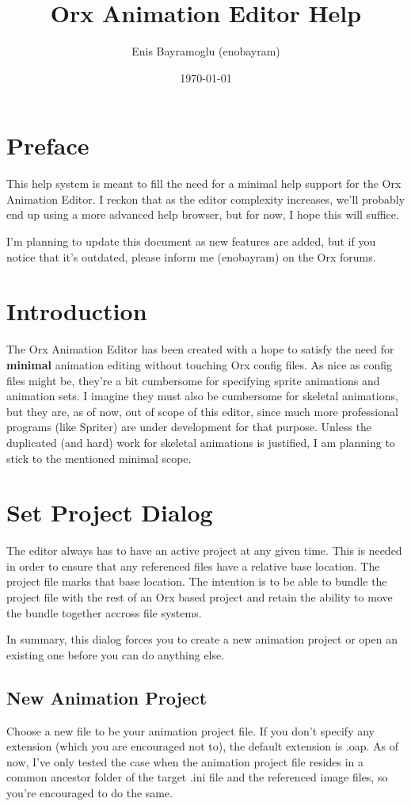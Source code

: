 \documentclass{article}
\title{Orx Animation Editor Help}
\author{Enis Bayramoglu (enobayram)}
\date{\today}
\begin{document}
\maketitle
\tableofcontents

\section{Preface}
This help system is meant to fill the need for a minimal help support for the Orx Animation Editor. I reckon that as the editor complexity increases,
we'll probably end up using a more advanced help browser, but for now, I hope this will suffice.

I'm planning to update this document as new features are added, but if you notice that it's outdated, please inform me (enobayram) on the Orx forums.

\section{Introduction}
The Orx Animation Editor has been created with a hope to satisfy the need for \textbf{minimal} animation editing without touching Orx config files. As nice as
config files might be, they're a bit cumbersome for specifying sprite animations and animation sets. I imagine they must also be cumbersome for skeletal
animations, but they are, as of now, out of scope of this editor, since much more professional programs (like Spriter) are under development for that purpose. Unless the duplicated (and hard) work for skeletal animations is justified, I am planning to stick to the mentioned minimal scope.

\section{Set Project Dialog}
The editor always has to have an active project at any given time. This is needed in order to ensure that any referenced files have a relative base location. The project
file marks that base location. The intention is to be able to bundle the project file with the rest of an Orx based project and retain the ability to move the bundle together accross file systems.

In summary, this dialog forces you to create a new animation project or open an existing one before you can do anything else.

\subsection{New Animation Project}
Choose a new file to be your animation project file. If you don't specify any extension (which you are encouraged not to), the default extension is .oap. As of now, I've
only tested the case when the animation project file resides in a common ancestor folder of the target .ini file and the referenced image files, so you're encouraged to
do the same.
\end{document}
